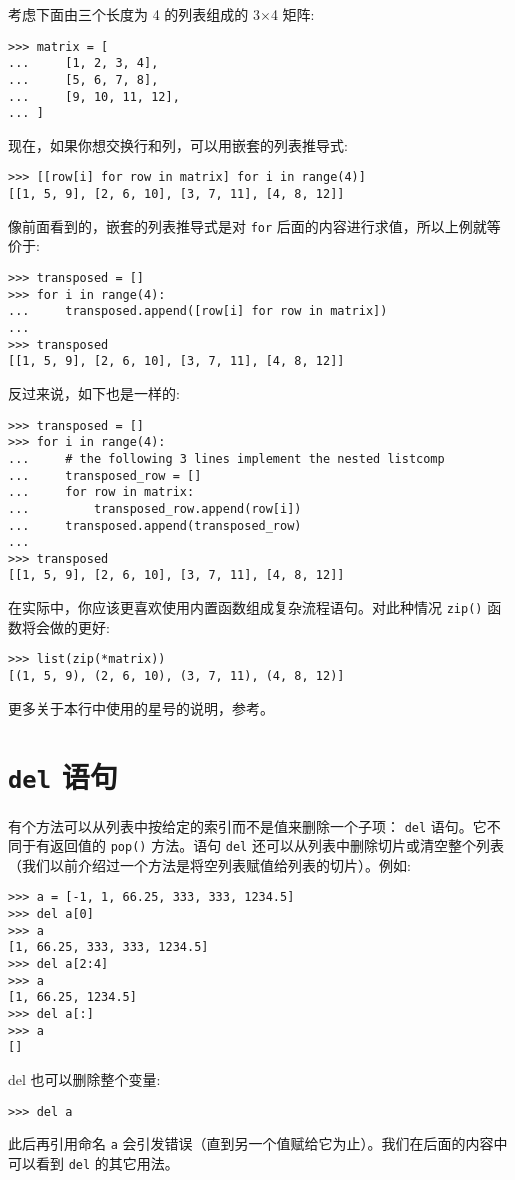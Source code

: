 考虑下面由三个长度为 4 的列表组成的 3$\times$4 矩阵:
\begin{lstlisting}
>>> matrix = [
...     [1, 2, 3, 4],
...     [5, 6, 7, 8],
...     [9, 10, 11, 12],
... ]
\end{lstlisting}
现在，如果你想交换行和列，可以用嵌套的列表推导式:
\begin{lstlisting}
>>> [[row[i] for row in matrix] for i in range(4)]
[[1, 5, 9], [2, 6, 10], [3, 7, 11], [4, 8, 12]]
\end{lstlisting}
像前面看到的，嵌套的列表推导式是对 \texttt{for} 后面的内容进行求值，所以上例就等价于:
\begin{lstlisting}
>>> transposed = []
>>> for i in range(4):
...     transposed.append([row[i] for row in matrix])
...
>>> transposed
[[1, 5, 9], [2, 6, 10], [3, 7, 11], [4, 8, 12]]
\end{lstlisting}
反过来说，如下也是一样的:
\begin{lstlisting}
>>> transposed = []
>>> for i in range(4):
...     # the following 3 lines implement the nested listcomp
...     transposed_row = []
...     for row in matrix:
...         transposed_row.append(row[i])
...     transposed.append(transposed_row)
...
>>> transposed
[[1, 5, 9], [2, 6, 10], [3, 7, 11], [4, 8, 12]]
\end{lstlisting}
在实际中，你应该更喜欢使用内置函数组成复杂流程语句。对此种情况 \texttt{zip()} 函数将会做的更好:
\begin{lstlisting}
>>> list(zip(*matrix))
[(1, 5, 9), (2, 6, 10), (3, 7, 11), (4, 8, 12)]
\end{lstlisting}
更多关于本行中使用的星号的说明，参考。
\section{\texttt{del} 语句}
有个方法可以从列表中按给定的索引而不是值来删除一个子项： \texttt{del} 语句。它不同于有返回值的 \texttt{pop()} 方法。语句 \texttt{del} 还可以从列表中删除切片或清空整个列表（我们以前介绍过一个方法是将空列表赋值给列表的切片）。例如:
\begin{lstlisting}
>>> a = [-1, 1, 66.25, 333, 333, 1234.5]
>>> del a[0]
>>> a
[1, 66.25, 333, 333, 1234.5]
>>> del a[2:4]
>>> a
[1, 66.25, 1234.5]
>>> del a[:]
>>> a
[]
\end{lstlisting}
del 也可以删除整个变量:
\begin{lstlisting}
>>> del a
\end{lstlisting}
此后再引用命名 \texttt{a} 会引发错误（直到另一个值赋给它为止）。我们在后面的内容中可以看到 \texttt{del} 的其它用法。
